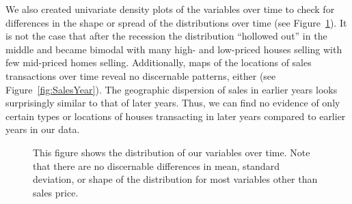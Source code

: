 \documentclass{article}\usepackage{graphicx, color}
\begin{document}
We also created univariate density plots of the variables over time to check for differences in the shape or spread of the distributions over time (see Figure~\ref{fig:DensityPlots}). It is not the case that after the recession the distribution ``hollowed out'' in the middle and became bimodal with many high- and low-priced houses selling with few mid-priced homes selling. Additionally, maps of the locations of sales transactions over time reveal no discernable patterns, either (see Figure~\ref{fig:SalesYear}). The geographic dispersion of sales in earlier years looks surprisingly similar to that of later years. Thus, we can find no evidence of only certain types or locations of houses transacting in later years compared to earlier years in our data.

\begin{figure}
\caption{This figure shows the distribution of our variables over time. Note that there are no discernable differences in mean, standard deviation, or shape of the distribution for most variables other than sales price.}
\label{fig:DensityPlots}
\end{figure}
\end{document}
